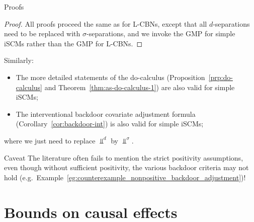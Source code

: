 \begin{frame}{Proofs}
  \begin{proof}
    All proofs proceed the same as for L-CBNs, except that all $d$-separations need to be replaced with $\sigma$-separations, and we invoke the GMP for simple iSCMs rather than the GMP for L-CBNs.
  \end{proof}

  \bigskip
  Similarly:
  \begin{itemize}
    \item The more detailed statements of the do-calculus (Proposition~\ref{prp:do-calculus} and Theorem~\ref{thm:as-do-calculus-1}) are also valid for simple iSCMs;
    \item The interventional backdoor covariate adjustment formula (Corollary~\ref{cor:backdoor-int}) is also valid for simple iSCMs;
  \end{itemize}
  where we just need to replace $\Perp^d$ by $\Perp^\sigma$.
  
  \bigskip
  \begin{block}{Caveat}
  The literature often fails to mention the strict positivity assumptions, even though without sufficient positivity, the various backdoor criteria may not hold
    (e.g.~Example~\ref{eg:counterexample_nonpositive_backdoor_adjustment})!
  \end{block}
\end{frame}


\part{Bounds on causal effects}
\frame{\partpage}

